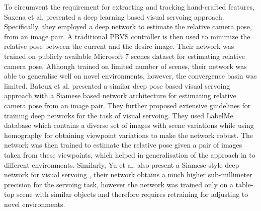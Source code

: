 \documentclass[letterpaper, 10 pt, conference]{ieeeconf}  %
\begin{document}
\indent To circumvent the requirement for extracting and tracking hand-crafted features, 
Saxena et al. \cite{servonet} presented a deep learning based visual servoing approach. Specifically, they employed a deep network to estimate the relative camera pose, from an image pair. A traditional PBVS controller is then used to minimize the relative pose between the current and the desire image. Their network was trained on publicly available Microsoft 7 scenes dataset \cite{7scene} for estimating relative camera pose. Although trained on limited number of scenes, their network was able to generalise well on novel environments, however, the convergence basin was limited. Bateux et al. \cite{trainingdeepvs} presented a similar deep pose based visual servoing approach with a Siamese \cite{siamese} based network architecture for estimating relative camera pose from an image pair. They further proposed  extensive guidelines for training deep networks for the task of visual servoing. They used LabelMe database \cite{labelme} which contains a diverse set of images with scene variations while using homography for obtaining viewpoint variations to make the network robust. The network was then trained to estimate the relative pose given a pair of images taken from these viewpoints, which helped in generalisation of the approach in to different environments.  Similarly, Yu et al. also present a Siamese style deep network for visual servoing \cite{siamesevs}, their network obtains a much higher sub-millimeter precision for the servoing task, however the network was trained only on a table-top scene with similar objects and therefore requires retraining for adjusting to novel environments. 

\end{document}
